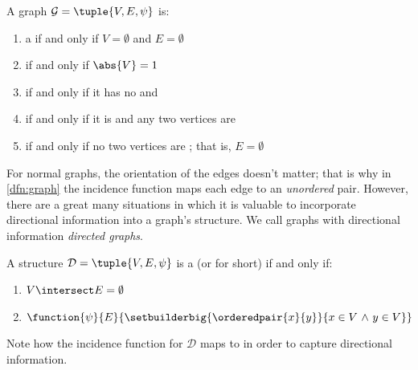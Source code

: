 \begin{dfn}
     \label{dfn:classification-of-graphs}
    A graph \( \mathcal{G} = \tuple{V, E, \psi} \) is:
    \begin{enumerate}[topsep=2pt,label=\textup{\texttt{(\alph*)}}]
        \item a  if and only if \( V = \emptyset \) and \( E = \emptyset \)
        \item {} if and only if \( \abs{V} = 1 \)
        \item {} if and only if it has no  and 
        \item {} if and only if it is  and any two vertices are 
        \item {} if and only if no two vertices are ; that is, \( E = \emptyset \)
    \end{enumerate}
\end{dfn}

\noindent
For normal graphs, the orientation of the edges doesn't matter; that is why in \cref{dfn:graph} the incidence function maps each edge to an \emph{unordered} pair.
However, there are a great many situations in which it is valuable to incorporate directional information into a graph's structure.
We call graphs with directional information \emph{directed graphs}.

\begin{dfn}[Digraphs]
     \label{dfn:directed-graph}
    A structure \( \mathcal{D} = \tuple{V, E, \psi} \) is a  (or  for short)
    if and only if:
    \begin{enumerate}[topsep=2pt,label=\textup{\texttt{(\alph*)}}]
        \item \( V \intersect E = \emptyset \) 
        \item \( \function{\psi}{E}{\setbuilderbig{\orderedpair{x}{y}}{x \in V \,\,{\land}\,\, y \in V}} \)
    \end{enumerate}
\end{dfn}

\begin{rem}
    Note how the incidence function for \( \mathcal{D} \) maps to  in order to capture directional information.
\end{rem}
